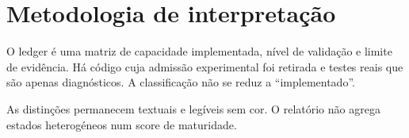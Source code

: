 \clearpage
\section{Metodologia de interpretação}
O ledger é uma matriz de capacidade implementada, nível de validação e limite de evidência. Há código cuja admissão experimental foi retirada e testes reais que são apenas diagnósticos. A classificação não se reduz a “implementado”. 


As distinções permanecem textuais e legíveis sem cor. O relatório não agrega estados heterogéneos num score de maturidade.
